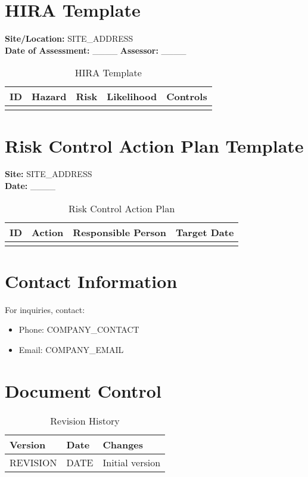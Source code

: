 \documentclass[12pt]{article}
\begin{document}
\section{HIRA Template}

\textbf{Site/Location:} {{SITE_ADDRESS}}\\
\textbf{Date of Assessment:} \_\_\_\_ \textbf{Assessor:} \_\_\_\_

\begin{table}[h]
    \centering
    \begin{tabular}{p{2cm}p{3cm}p{3cm}p{3cm}p{3cm}}
        \toprule
        \textbf{ID} & \textbf{Hazard} & \textbf{Risk} & \textbf{Likelihood} & \textbf{Controls} \\
        \midrule
        & & & & \\
        \bottomrule
    \end{tabular}
    \caption{HIRA Template}
\end{table}

\section{Risk Control Action Plan Template}

\textbf{Site:} {{SITE_ADDRESS}}\\
\textbf{Date:} \_\_\_\_

\begin{table}[h]
    \centering
    \begin{tabular}{p{2cm}p{5cm}p{3cm}p{3cm}}
        \toprule
        \textbf{ID} & \textbf{Action} & \textbf{Responsible Person} & \textbf{Target Date} \\
        \midrule
        & & & \\
        \bottomrule
    \end{tabular}
    \caption{Risk Control Action Plan}
\end{table}

\section{Contact Information}
For inquiries, contact:
\begin{itemize}
    \item Phone: {{COMPANY_CONTACT}}
    \item Email: {{COMPANY_EMAIL}}
\end{itemize}

\section{Document Control}
\begin{table}[h]
    \centering
    \begin{tabular}{p{3cm}p{3cm}p{6cm}}
        \toprule
        \textbf{Version} & \textbf{Date} & \textbf{Changes} \\
        \midrule
        {{REVISION}} & {{DATE}} & Initial version \\
        \bottomrule
    \end{tabular}
    \caption{Revision History}
\end{table}
\end{document}
